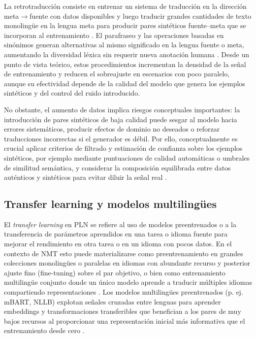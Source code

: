 \documentclass[12pt,a4paper,oneside]{book}
\begin{document}
La retrotraducción consiste en entrenar un sistema de traducción en la dirección meta$\rightarrow$fuente con datos disponibles y luego traducir grandes cantidades de texto monolingüe en la lengua meta para producir pares sintéticos fuente--meta que se incorporan al entrenamiento \parencite{sennrich2016bt,edunov2018bt}. El parafraseo y las operaciones basadas en sinónimos generan alternativas al mismo significado en la lengua fuente o meta, aumentando la diversidad léxica sin requerir nueva anotación humana \parencite{wei2019eda}. Desde un punto de vista teórico, estos procedimientos incrementan la densidad de la señal de entrenamiento y reducen el sobreajuste en escenarios con poco paralelo, aunque su efectividad depende de la calidad del modelo que genera los ejemplos sintéticos y del control del ruido introducido.

No obstante, el aumento de datos implica riesgos conceptuales importantes: la introducción de pares sintéticos de baja calidad puede sesgar al modelo hacia errores sistemáticos, producir efectos de dominio no deseados o reforzar traducciones incorrectas si el generador es débil. Por ello, conceptualmente es crucial aplicar criterios de filtrado y estimación de confianza sobre los ejemplos sintéticos, por ejemplo mediante puntuaciones de calidad automáticas o umbrales de similitud semántica, y considerar la composición equilibrada entre datos auténticos y sintéticos para evitar diluir la señal real \parencite{fadaee2017,edunov2018bt}.

\subsection{\texorpdfstring{Transfer learning y modelos multilingües }{Transfer learning y modelos multilingües }}\label{transfer-learning-y-modelos-multilinguxfces}

El \emph{transfer learning} en PLN se refiere al uso de modelos preentrenados o a la transferencia de parámetros aprendidos en una tarea o idioma fuente para mejorar el rendimiento en otra tarea o en un idioma con pocos datos. En el contexto de NMT esto puede materializarse como preentrenamiento en grandes colecciones monolingües o paralelas en idiomas con abundante recurso y posterior ajuste fino (fine-tuning) sobre el par objetivo, o bien como entrenamiento multilingüe conjunto donde un único modelo aprende a traducir múltiples idiomas compartiendo representaciones \parencite{zoph2016}. Los modelos multilingües preentrenados (p. ej. mBART, NLLB) explotan señales cruzadas entre lenguas para aprender embeddings y transformaciones transferibles que benefician a los pares de muy bajos recursos al proporcionar una representación inicial más informativa que el entrenamiento desde cero \parencite{liu2020mbart,nllb2022}.
\end{document}
